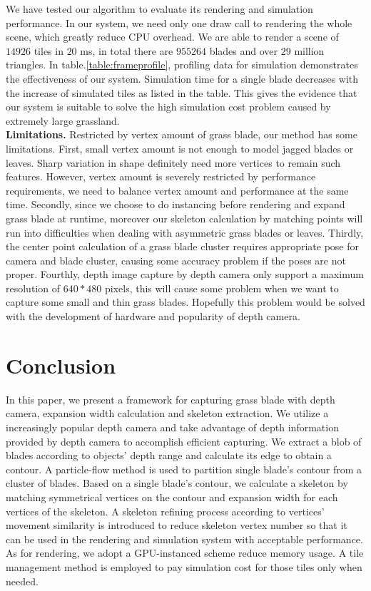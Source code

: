 \documentclass[10pt,journal,compsoc]{IEEEtran}
\begin{document}
We have tested our algorithm to evaluate its rendering and simulation performance. In our system, we need only one draw call to rendering the whole scene, which greatly reduce CPU overhead. We are able to render a scene of $14926$ tiles in $20$ ms, in total there are $955264$ blades and over $29$ million triangles. In table.\ref{table:frameprofile}, profiling data for simulation demonstrates the effectiveness of our system. Simulation time for a single blade decreases with the increase of simulated tiles as listed in the table. This gives the evidence that our system is suitable to solve the high simulation cost problem caused by extremely large grassland.\\

\textbf{Limitations.} Restricted by vertex amount of grass blade, our method has some limitations. First, small vertex amount is not enough to model jagged blades or leaves. Sharp variation in shape definitely need more vertices to remain such features. However, vertex amount is severely restricted by performance requirements, we need to balance vertex amount and performance at the same time. Secondly, since we choose to do instancing before rendering and expand grass blade at runtime, moreover our skeleton calculation by matching points will run into difficulties when dealing with asymmetric grass blades or leaves. Thirdly, the center point calculation of a grass blade cluster requires appropriate pose for camera and blade cluster, causing some accuracy problem if the poses are not proper. Fourthly, depth image capture by depth camera only support a maximum resolution of $640*480$ pixels, this will cause some problem when we want to capture some small and thin grass blades. Hopefully this problem would be solved with the development of hardware and popularity of depth camera.

\section{Conclusion}
In this paper, we present a framework for capturing grass blade with depth camera, expansion width calculation and skeleton extraction. We utilize a increasingly popular depth camera and take advantage of depth information provided by depth camera to accomplish efficient capturing. We extract a blob of blades according to objects' depth range and calculate its edge to obtain a contour. A particle-flow method is used to partition single blade's contour from a cluster of blades. Based on a single blade's contour, we calculate a skeleton by matching symmetrical vertices on the contour and expansion width for each vertices of the skeleton. A skeleton refining process according to vertices' movement similarity is introduced to reduce skeleton vertex number so that it can be used in the rendering and simulation system with acceptable performance. As for rendering, we adopt a GPU-instanced scheme reduce memory usage. A tile management method is employed to pay simulation cost for those tiles only when needed.\\
\end{document}
